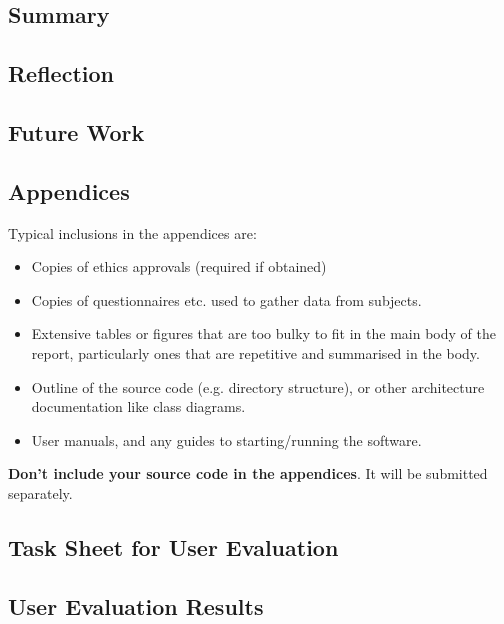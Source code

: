 \documentclass{l4proj}
\begin{document}
\section{Summary}

\section{Reflection}



\section{Future Work}

%
% 

\begin{appendices}

\chapter{Appendices}

Typical inclusions in the appendices are:

\begin{itemize}
\item
  Copies of ethics approvals (required if obtained)
\item
  Copies of questionnaires etc. used to gather data from subjects.
\item
  Extensive tables or figures that are too bulky to fit in the main body of
  the report, particularly ones that are repetitive and summarised in the body.

\item Outline of the source code (e.g. directory structure), or other architecture documentation like class diagrams.

\item User manuals, and any guides to starting/running the software.

\end{itemize}

\textbf{Don't include your source code in the appendices}. It will be
submitted separately.

\section{Task Sheet for User Evaluation}

\section{User Evaluation Results}

\end{appendices}
\end{document}
